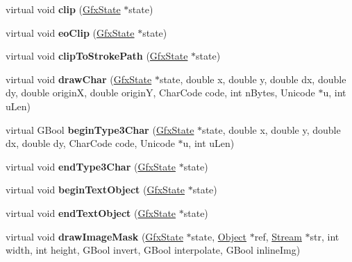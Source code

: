\begin{DoxyCompactItemize}
virtual void {\bfseries clip} (\hyperlink{class_gfx_state}{Gfx\+State} $\ast$state)
\item 
\mbox{\label{class_splash_output_dev_a277d7aa13caf27a660d5dfd0483b9a85}} 
virtual void {\bfseries eo\+Clip} (\hyperlink{class_gfx_state}{Gfx\+State} $\ast$state)
\item 
\mbox{\label{class_splash_output_dev_a885b85f871c4947b2d1b05d65ad18f08}} 
virtual void {\bfseries clip\+To\+Stroke\+Path} (\hyperlink{class_gfx_state}{Gfx\+State} $\ast$state)
\item 
\mbox{\label{class_splash_output_dev_ae7e9cfe10183b147c55ae4c597ae1687}} 
virtual void {\bfseries draw\+Char} (\hyperlink{class_gfx_state}{Gfx\+State} $\ast$state, double x, double y, double dx, double dy, double originX, double originY, Char\+Code code, int n\+Bytes, Unicode $\ast$u, int u\+Len)
\item 
\mbox{\label{class_splash_output_dev_ae79cd61d955882fcbbb480c32c025145}} 
virtual G\+Bool {\bfseries begin\+Type3\+Char} (\hyperlink{class_gfx_state}{Gfx\+State} $\ast$state, double x, double y, double dx, double dy, Char\+Code code, Unicode $\ast$u, int u\+Len)
\item 
\mbox{\label{class_splash_output_dev_a9ee678643377b38d019cff486216ae4e}} 
virtual void {\bfseries end\+Type3\+Char} (\hyperlink{class_gfx_state}{Gfx\+State} $\ast$state)
\item 
\mbox{\label{class_splash_output_dev_a107a1dd5702716f582842c5fd1246563}} 
virtual void {\bfseries begin\+Text\+Object} (\hyperlink{class_gfx_state}{Gfx\+State} $\ast$state)
\item 
\mbox{\label{class_splash_output_dev_a60602b81a51aa18cfdce4f6c66d5d32c}} 
virtual void {\bfseries end\+Text\+Object} (\hyperlink{class_gfx_state}{Gfx\+State} $\ast$state)
\item 
\mbox{\label{class_splash_output_dev_adf00a5fa24ad9fe56caa115a520435e6}} 
virtual void {\bfseries draw\+Image\+Mask} (\hyperlink{class_gfx_state}{Gfx\+State} $\ast$state, \hyperlink{class_object}{Object} $\ast$ref, \hyperlink{class_stream}{Stream} $\ast$str, int width, int height, G\+Bool invert, G\+Bool interpolate, G\+Bool inline\+Img)

\end{DoxyCompactItemize}
